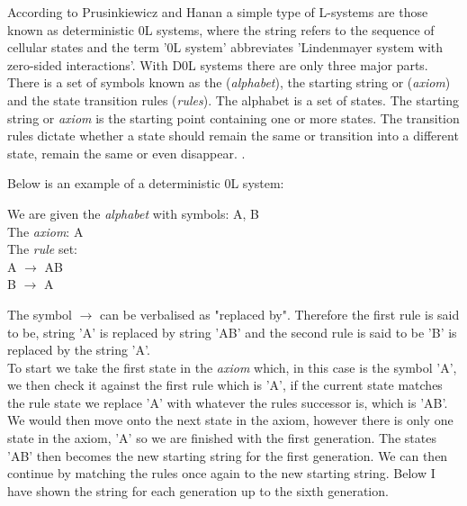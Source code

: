 \begin{flushleft}

According to Prusinkiewicz and Hanan a simple type of L-systems are those known as deterministic 0L systems, where the string refers to the sequence of cellular states and the term '0L system' abbreviates 'Lindenmayer system with zero-sided interactions'.  With D0L systems there are only three major parts. There is a set of symbols known as the (\textit{alphabet}), the starting string or (\textit{axiom}) and the state transition rules (\textit{rules}). The alphabet is a set of states. The starting string or \textit{axiom} is the starting point containing one or more states. The transition rules dictate whether a state should remain the same or transition into a different state, remain the same or even disappear. \cite{prusinkiewicz2013lindenmayer}. \\

\vspace{5mm}

Below is an example of a deterministic 0L system: \\

\vspace{5mm}

We are given the \textit{alphabet} with symbols: A, B \\ 
The \textit{axiom}: A \\
The \textit{rule} set: \\ 
A $\rightarrow$ AB \\
B $\rightarrow$ A \\

\vspace{5mm}

The symbol $\rightarrow$ can be verbalised as "replaced by". Therefore the first rule is said to be, string 'A' is replaced by string 'AB' and the second rule is said to be 'B' is replaced by the string 'A'.\\
To start we take the first state in the \textit{axiom} which, in this case is the symbol 'A', we then check it against the first rule which is 'A', if the current state matches the rule state we replace 'A' with whatever the rules successor is, which is 'AB'. We would then move onto the next state in the axiom, however there is only one state in the axiom, 'A' so we are finished with the first generation. The states 'AB' then becomes the new starting string for the first generation. We can then continue by matching the rules once again to the new starting string. Below I have shown the string for each generation up to the sixth generation.\\


\end{flushleft}
